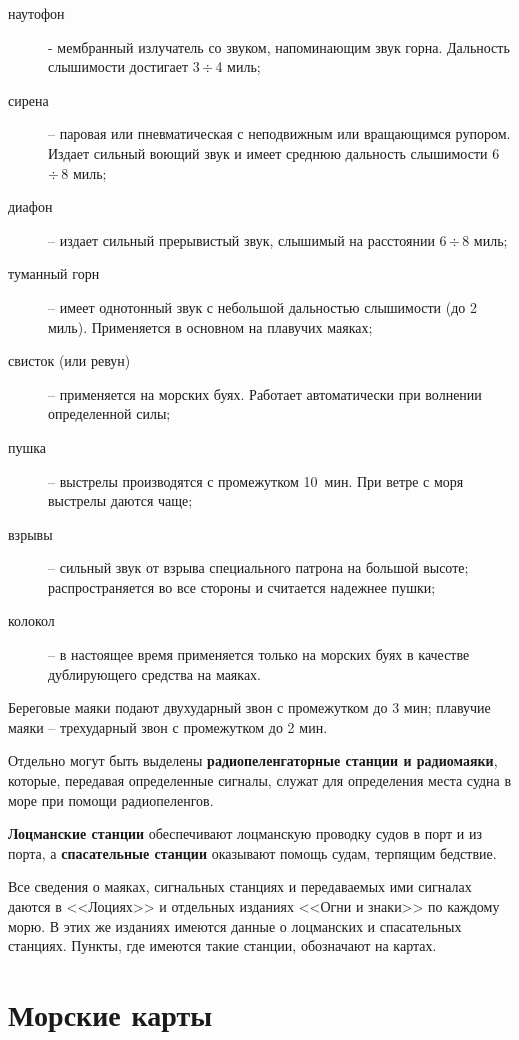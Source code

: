 \documentclass[a4paper, 12pt, twoside, final, book, russian, fittopage, cyremdash]{ncc}
\newcommand{\otdo}{\,\ensuremath{\div}\,}
\begin{document}
\begin{description}
\item [наутофон] \-- мембранный излучатель со звуком, напоминающим звук горна. Дальность слышимости достигает 3\otdo 4 миль; 
\item [сирена] \--- паровая или пневматическая с неподвижным или вращающимся рупором. Издает сильный воющий звук и имеет среднюю дальность слышимости 6\otdo 8 миль; 
\item [диафон] \--- издает сильный прерывистый звук, слышимый на расстоянии 6\otdo 8 миль;
\item [туманный горн] \--- имеет однотонный звук с небольшой дальностью слышимости (до 2 миль). Применяется в основном на плавучих маяках;
\item [свисток (или ревун)] \--- применяется на морских буях. Работает автоматически при волнении определенной силы;
\item [пушка] \--- выстрелы производятся с промежутком 10~мин. При ветре с моря выстрелы даются чаще;
\item [взрывы] \--- сильный звук от взрыва специального патрона на большой высоте; распространяется во все стороны и считается надежнее пушки;
\item [колокол] \--- в настоящее время применяется только на морских буях в качестве дублирующего средства на маяках.
\end{description} 

Береговые маяки подают двухударный звон с промежутком до 3 мин; плавучие маяки \--- трехударный звон с промежутком до 2 мин.

Отдельно могут быть выделены \textbf{радиопеленгаторные станции и радиомаяки}, которые, передавая определенные сигналы, служат для определения места судна в море при помощи радиопеленгов.

\textbf{Лоцманские станции} обеспечивают лоцманскую проводку судов в порт и из порта, а \textbf{спасательные станции} оказывают помощь судам, терпящим бедствие.

Все сведения о маяках, сигнальных станциях и передаваемых ими сигналах даются в <<Лоциях>> и отдельных изданиях <<Огни и знаки>> по каждому морю. В этих же изданиях имеются данные о лоцманских и спасательных станциях. Пункты, где имеются такие станции, обозначают на картах.

\section{Морские карты}\label{sec:maps}
\end{document}
